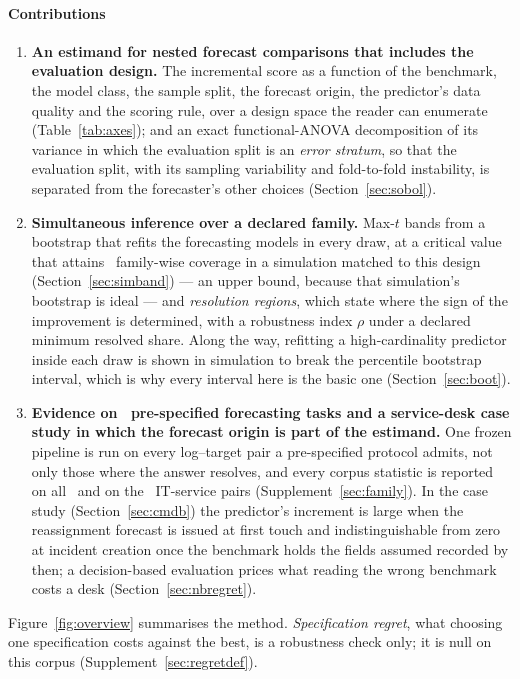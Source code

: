 \documentclass[11pt,3p,review,authoryear]{elsarticle}
\theoremstyle{definition}
\begin{document}
\paragraph{Contributions}
\begin{enumerate}
\item \textbf{An estimand for nested forecast comparisons that includes the
evaluation design.} The incremental score as a function of the benchmark,
the model class, the sample split, the forecast origin, the predictor's data
quality and the scoring rule, over a design space the reader can enumerate
(Table~\ref{tab:axes}); and an exact functional-ANOVA decomposition of its
variance in which the evaluation split is an \emph{error stratum}, so that
the evaluation split, with its sampling variability and fold-to-fold
instability, is separated from the forecaster's other choices
(Section~\ref{sec:sobol}).
\item \textbf{Simultaneous inference over a declared family.} Max-$t$ bands
from a bootstrap that refits the forecasting models in every draw, at a
critical value that attains \covEmpHeavyWholeAtDesign\ family-wise coverage
in a simulation matched to this design (Section~\ref{sec:simband}) --- an
upper bound, because that simulation's bootstrap is ideal --- and \emph{resolution
regions}, which state where the sign of the improvement is determined, with a
robustness index $\rho$ under a declared minimum resolved share. Along the
way, refitting a high-cardinality predictor inside each draw is shown in
simulation to break the percentile bootstrap interval, which is why every
interval here is the basic one (Section~\ref{sec:boot}).
\item \textbf{Evidence on \nPairs\ pre-specified forecasting tasks and a
service-desk case study in which the forecast origin is part of the
estimand.} One frozen pipeline is run on every log--target pair a pre-specified
protocol admits, not only those where the answer resolves, and every corpus
statistic is reported on all \nPairs\ and on the \nItsmPairs\ IT-service
pairs (Supplement~\ref{sec:family}). In the case study
(Section~\ref{sec:cmdb}) the predictor's increment is large when the
reassignment forecast is issued at first touch and indistinguishable from
zero at incident creation once the benchmark holds the fields assumed recorded
by then; a decision-based evaluation prices what reading the wrong benchmark
costs a desk (Section~\ref{sec:nbregret}).
\end{enumerate}

\noindent Figure~\ref{fig:overview} summarises the method.
\emph{Specification regret}, what choosing one specification costs against
the best, is a robustness check only; it is null on this corpus
(Supplement~\ref{sec:regretdef}).
\end{document}
